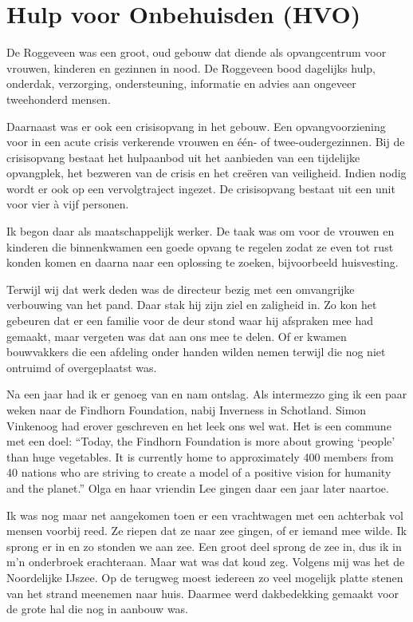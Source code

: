 \documentclass[12pt,twoside, openright]{memoir}
\begin{document}
\chapter{Hulp voor Onbehuisden (HVO)} %
\label{cha:hvo}

De Roggeveen was een groot, oud gebouw dat diende als opvangcentrum voor vrouwen, kinderen en gezinnen in nood. De Roggeveen bood dagelijks hulp, onderdak, verzorging, ondersteuning, informatie en advies aan ongeveer tweehonderd mensen.

Daarnaast was er ook een crisisopvang in het gebouw. Een opvangvoorziening voor in een acute crisis verkerende vrouwen en één- of twee-oudergezinnen. Bij de crisisopvang bestaat het hulpaanbod uit het aanbieden van een tijdelijke opvangplek, het bezweren van de crisis en het creëren van veiligheid. Indien nodig wordt er ook op een vervolgtraject ingezet. De crisisopvang bestaat uit een unit voor vier à vijf personen.

Ik begon daar als maatschappelijk werker. De taak was om voor de vrouwen en kinderen die binnenkwamen een goede opvang te regelen zodat ze even tot rust konden komen en daarna naar een oplossing te zoeken, bijvoorbeeld huisvesting. 

Terwijl wij dat werk deden was de directeur bezig met een omvangrijke verbouwing van het pand. Daar stak hij zijn ziel en zaligheid in. Zo kon het gebeuren dat er een familie voor de deur stond waar hij afspraken mee had gemaakt, maar vergeten was dat aan ons mee te delen. Of er kwamen bouwvakkers die een afdeling onder handen wilden nemen terwijl die nog niet ontruimd of overgeplaatst was. 

Na een jaar had ik er genoeg van en nam ontslag. Als intermezzo ging ik een paar weken naar de Findhorn Foundation, nabij Inverness in Schotland. Simon Vinkenoog had erover geschreven en het leek ons wel wat. Het is een commune met een doel: ``Today, the Findhorn Foundation is more about growing `people' than huge vegetables. It is currently home to approximately 400 members from 40 nations who are striving to create a model of a positive vision for humanity and the planet.'' Olga en haar vriendin Lee gingen daar een jaar later naartoe.

Ik was nog maar net aangekomen toen er een vrachtwagen met een achterbak vol mensen voorbij reed. Ze riepen dat ze naar zee gingen, of er iemand mee wilde. Ik sprong er in en zo stonden we aan zee. Een groot deel sprong de zee in, dus ik in m’n onderbroek erachteraan. Maar wat was dat koud zeg. Volgens mij was het de Noordelijke IJszee. Op de terugweg moest iedereen zo veel mogelijk platte stenen van het strand meenemen naar huis. Daarmee werd dakbedekking gemaakt voor de grote hal die nog in aanbouw was. 
\end{document}
